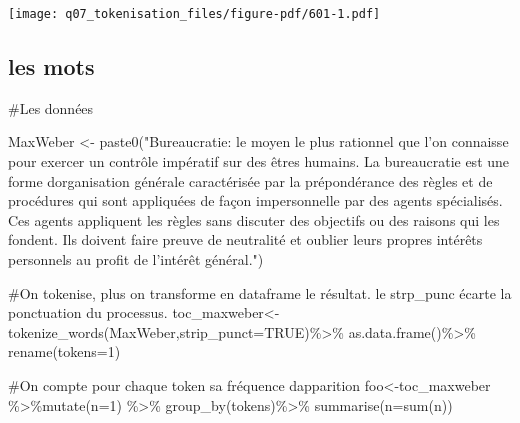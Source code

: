 \documentclass[
  letterpaper,
  DIV=11,
  numbers=noendperiod]{scrreprt}
\newenvironment{Shaded}{\begin{snugshade}}{\end{snugshade}}
\newcommand{\AttributeTok}[1]{\textcolor[rgb]{0.40,0.45,0.13}{#1}}
\newcommand{\CommentTok}[1]{\textcolor[rgb]{0.37,0.37,0.37}{#1}}
\newcommand{\ConstantTok}[1]{\textcolor[rgb]{0.56,0.35,0.01}{#1}}
\newcommand{\DecValTok}[1]{\textcolor[rgb]{0.68,0.00,0.00}{#1}}
\newcommand{\FunctionTok}[1]{\textcolor[rgb]{0.28,0.35,0.67}{#1}}
\newcommand{\NormalTok}[1]{\textcolor[rgb]{0.00,0.23,0.31}{#1}}
\newcommand{\OtherTok}[1]{\textcolor[rgb]{0.00,0.23,0.31}{#1}}
\newcommand{\SpecialCharTok}[1]{\textcolor[rgb]{0.37,0.37,0.37}{#1}}
\newcommand{\StringTok}[1]{\textcolor[rgb]{0.13,0.47,0.30}{#1}}
\begin{document}
\texttt{[image: q07\_tokenisation\_files/figure-pdf/601-1.pdf]}

\subsection{les mots}\label{les-mots}

\begin{Shaded}
\begin{Highlighting}[]
\CommentTok{\#Les données}

\NormalTok{MaxWeber }\OtherTok{\textless{}{-}} \FunctionTok{paste0}\NormalTok{(}\StringTok{"Bureaucratie: le moyen le plus rationnel que l’on connaisse pour exercer un contrôle impératif sur des êtres humains. La bureaucratie est une forme d\textquotesingle{}organisation générale caractérisée par la prépondérance des règles et de procédures qui sont appliquées de façon impersonnelle par des agents spécialisés. Ces agents appliquent les règles sans discuter des objectifs ou des raisons qui les fondent. Ils doivent faire preuve de neutralité et oublier leurs propres intérêts personnels au profit de l’intérêt général."}\NormalTok{)}

\CommentTok{\#On tokenise, plus on transforme en dataframe le résultat. le strp\_punc écarte la ponctuation du processus.}
\NormalTok{toc\_maxweber}\OtherTok{\textless{}{-}}\FunctionTok{tokenize\_words}\NormalTok{(MaxWeber,}\AttributeTok{strip\_punct=}\ConstantTok{TRUE}\NormalTok{)}\SpecialCharTok{\%\textgreater{}\%}
        \FunctionTok{as.data.frame}\NormalTok{()}\SpecialCharTok{\%\textgreater{}\%}
        \FunctionTok{rename}\NormalTok{(}\AttributeTok{tokens=}\DecValTok{1}\NormalTok{)}

\CommentTok{\#On compte pour chaque token sa fréquence d\textquotesingle{}apparition}
\NormalTok{foo}\OtherTok{\textless{}{-}}\NormalTok{toc\_maxweber }\SpecialCharTok{\%\textgreater{}\%}\FunctionTok{mutate}\NormalTok{(}\AttributeTok{n=}\DecValTok{1}\NormalTok{) }\SpecialCharTok{\%\textgreater{}\%} 
        \FunctionTok{group\_by}\NormalTok{(tokens)}\SpecialCharTok{\%\textgreater{}\%} 
        \FunctionTok{summarise}\NormalTok{(}\AttributeTok{n=}\FunctionTok{sum}\NormalTok{(n))}


\end{Highlighting}
\end{Shaded}
\end{document}
